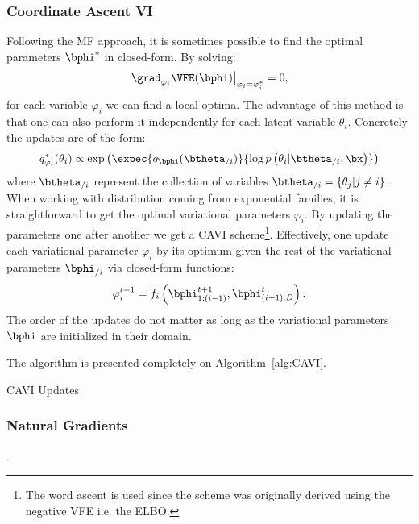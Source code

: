 \subsubsection{Coordinate Ascent VI}

Following the \ac{MF} approach, it is sometimes possible to find the optimal parameters $\bphi^*$ in closed-form.
By solving:
\begin{align}
\left.\grad_{\varphi_i}\VFE(\bphi)\right\vert_{\varphi_i=\varphi_i^*} = 0,
\end{align}
for each variable $\varphi_i$ we can find a local optima.
The advantage of this method is that one can also perform it independently for each latent variable $\theta_i$.
Concretely the updates are of the form:
\begin{align}
q_{\varphi_i}^*(\theta_i) \propto \exp\left(\expec{q_{\bphi}(\btheta_{/i})}{\log p\left(\theta_i|\btheta_{/i},\bx\right)}\right)
\end{align}
where $\btheta_{/i}$ represent the collection of variables $\btheta_{/i} = \{\theta_j | j \neq i\}$.
When working with distribution coming from exponential families, it is straightforward to get the optimal variational parameters $\varphi_i$.
By updating the parameters one after another we get a \ac{CAVI} scheme\footnote{The word ascent is used since the scheme was originally derived using the negative \ac{VFE} i.e. the \ac{ELBO}.}.
Effectively, one update each variational parameter $\varphi_i$ by its optimum given the rest of the variational parameters $\bphi_{/i}$ via closed-form functions:
\begin{align}
\varphi_i^{t+1} = f_i\left(\bphi_{1:(i-1)}^{t+1}, \bphi_{(i+1):D}^t\right).
\end{align}
The order of the updates do not matter as long as the variational parameters $\bphi$ are initialized in their domain.

The algorithm is presented completely on Algorithm~\ref{alg:CAVI}.

\begin{algorithm}
    \caption{CAVI Updates}
\end{algorithm}


\subsubsection{Natural Gradients}



.



